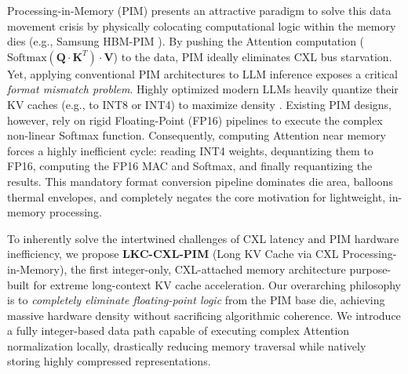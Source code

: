 \documentclass[10pt,conference]{IEEEtran}
\begin{document}
Processing-in-Memory (PIM) presents an attractive paradigm to solve this data movement crisis by physically colocating computational logic within the memory dies (e.g., Samsung HBM-PIM \cite{samsung_pim}). By pushing the Attention computation ($\text{Softmax}(\mathbf{Q} \cdot \mathbf{K}^T) \cdot \mathbf{V}$) to the data, PIM ideally eliminates CXL bus starvation. Yet, applying conventional PIM architectures to LLM inference exposes a critical \textit{format mismatch problem}. Highly optimized modern LLMs heavily quantize their KV caches (e.g., to INT8 or INT4) to maximize density \cite{llm_outliers, gptq}. Existing PIM designs, however, rely on rigid Floating-Point (FP16) pipelines to execute the complex non-linear Softmax function. Consequently, computing Attention near memory forces a highly inefficient cycle: reading INT4 weights, dequantizing them to FP16, computing the FP16 MAC and Softmax, and finally requantizing the results. This mandatory format conversion pipeline dominates die area, balloons thermal envelopes, and completely negates the core motivation for lightweight, in-memory processing.

To inherently solve the intertwined challenges of CXL latency and PIM hardware inefficiency, we propose \textbf{LKC-CXL-PIM} (Long KV Cache via CXL Processing-in-Memory), the first integer-only, CXL-attached memory architecture purpose-built for extreme long-context KV cache acceleration. Our overarching philosophy is to \textit{completely eliminate floating-point logic} from the PIM base die, achieving massive hardware density without sacrificing algorithmic coherence. We introduce a fully integer-based data path capable of executing complex Attention normalization locally, drastically reducing memory traversal while natively storing highly compressed representations.
\end{document}
